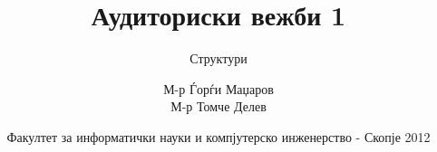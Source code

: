 

\author[АВ1]{М-р Ѓорѓи Маџаров\\М-р Томче Делев}
\title[Објектно ориентирано програмирање]{Аудиториски вежби 1}
\subtitle{Структури}
\date{Факултет за информатички науки и компјутерско инженерство - Скопје 2012}





\frame[t,plain]{\titlepage}









